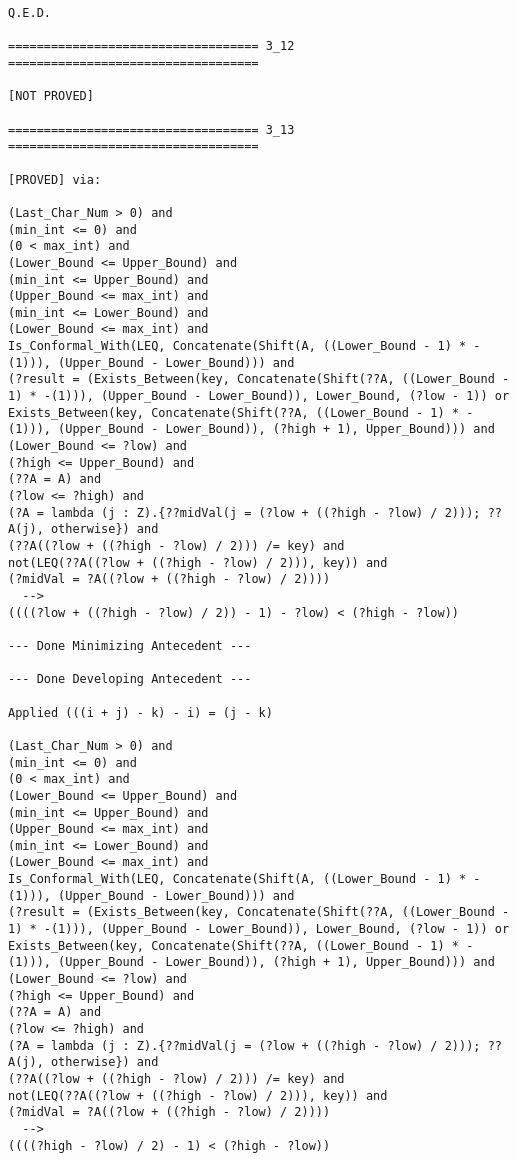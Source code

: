 \begin{lstlisting}[language=resolve]
Q.E.D.

=================================== 3_12 ===================================

[NOT PROVED]

=================================== 3_13 ===================================

[PROVED] via:

(Last_Char_Num > 0) and
(min_int <= 0) and
(0 < max_int) and
(Lower_Bound <= Upper_Bound) and
(min_int <= Upper_Bound) and
(Upper_Bound <= max_int) and
(min_int <= Lower_Bound) and
(Lower_Bound <= max_int) and
Is_Conformal_With(LEQ, Concatenate(Shift(A, ((Lower_Bound - 1) * -(1))), (Upper_Bound - Lower_Bound))) and
(?result = (Exists_Between(key, Concatenate(Shift(??A, ((Lower_Bound - 1) * -(1))), (Upper_Bound - Lower_Bound)), Lower_Bound, (?low - 1)) or Exists_Between(key, Concatenate(Shift(??A, ((Lower_Bound - 1) * -(1))), (Upper_Bound - Lower_Bound)), (?high + 1), Upper_Bound))) and
(Lower_Bound <= ?low) and
(?high <= Upper_Bound) and
(??A = A) and
(?low <= ?high) and
(?A = lambda (j : Z).{??midVal(j = (?low + ((?high - ?low) / 2))); ??A(j), otherwise}) and
(??A((?low + ((?high - ?low) / 2))) /= key) and
not(LEQ(??A((?low + ((?high - ?low) / 2))), key)) and
(?midVal = ?A((?low + ((?high - ?low) / 2))))
  -->
((((?low + ((?high - ?low) / 2)) - 1) - ?low) < (?high - ?low))

--- Done Minimizing Antecedent ---

--- Done Developing Antecedent ---

Applied (((i + j) - k) - i) = (j - k)

(Last_Char_Num > 0) and
(min_int <= 0) and
(0 < max_int) and
(Lower_Bound <= Upper_Bound) and
(min_int <= Upper_Bound) and
(Upper_Bound <= max_int) and
(min_int <= Lower_Bound) and
(Lower_Bound <= max_int) and
Is_Conformal_With(LEQ, Concatenate(Shift(A, ((Lower_Bound - 1) * -(1))), (Upper_Bound - Lower_Bound))) and
(?result = (Exists_Between(key, Concatenate(Shift(??A, ((Lower_Bound - 1) * -(1))), (Upper_Bound - Lower_Bound)), Lower_Bound, (?low - 1)) or Exists_Between(key, Concatenate(Shift(??A, ((Lower_Bound - 1) * -(1))), (Upper_Bound - Lower_Bound)), (?high + 1), Upper_Bound))) and
(Lower_Bound <= ?low) and
(?high <= Upper_Bound) and
(??A = A) and
(?low <= ?high) and
(?A = lambda (j : Z).{??midVal(j = (?low + ((?high - ?low) / 2))); ??A(j), otherwise}) and
(??A((?low + ((?high - ?low) / 2))) /= key) and
not(LEQ(??A((?low + ((?high - ?low) / 2))), key)) and
(?midVal = ?A((?low + ((?high - ?low) / 2))))
  -->
((((?high - ?low) / 2) - 1) < (?high - ?low))


\end{lstlisting}
